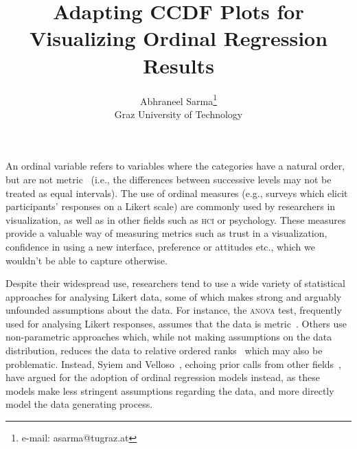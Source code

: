 \documentclass{vgtc}                          %
\title{Adapting CCDF Plots for Visualizing Ordinal Regression Results}
\author{Abhraneel Sarma\thanks{e-mail: asarma@tugraz.at}\\ %
        \scriptsize Graz University of Technology}
\begin{document}


\maketitle

An ordinal variable refers to variables where the categories have a natural order, but are not metric~\cite{stevens_theory_1946} (i.e., the differences between successive levels may not be treated as equal intervals). The use of ordinal measures (e.g., surveys which elicit participants' responses on a Likert scale) are commonly used by researchers in visualization, as well as in other fields such as \textsc{hci} or psychology. These measures provide a valuable way of measuring metrics such as trust in a visualization, confidence in using a new interface, preference or attitudes etc., which we wouldn't be able to capture otherwise. 


Despite their widespread use, researchers tend to use a wide variety of statistical approaches for analysing Likert data, some of which makes strong and arguably unfounded assumptions about the data. For instance, the \textsc{anova} test, frequently used for analysing Likert responses, assumes that the data is metric~\cite{liddell_analyzing_2018}. Others use non-parametric approaches which, while not making assumptions on the data distribution, reduces the data to relative ordered ranks~\cite{victorsyiem_better_2026} which may also be problematic. Instead, Syiem and Velloso~\cite{victorsyiem_better_2026}, echoing prior calls from other fields~\cite{liddell_analyzing_2018}, have argued for the adoption of ordinal regression models instead, as these models make less stringent assumptions regarding the data, and more directly model the data generating process. 
\end{document}
